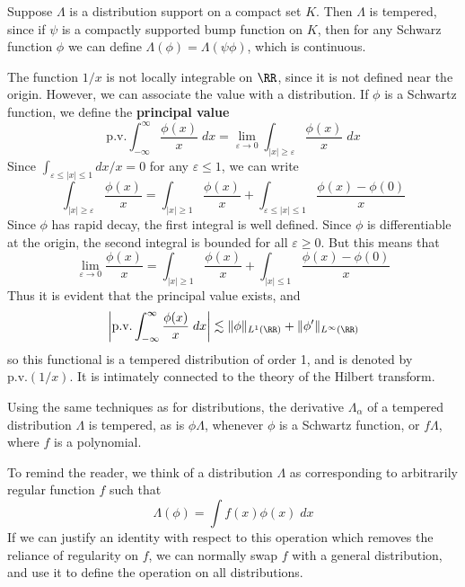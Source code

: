 \begin{example}
	Suppose $\Lambda$ is a distribution support on a compact set $K$. Then $\Lambda$ is tempered, since if $\psi$ is a compactly supported bump function on $K$, then for any Schwarz function $\phi$ we can define $\Lambda(\phi) = \Lambda(\psi \phi)$, which is continuous.
\end{example}

\begin{example}
	The function $1/x$ is not locally integrable on $\RR$, since it is not defined near the origin. However, we can associate the value with a distribution. If $\phi$ is a Schwartz function, we define the {\bf principal value}
	\[ \text{p.v.} \int_{-\infty}^\infty \frac{\phi(x)}{x}\; dx = \lim_{\varepsilon \to 0} \int_{|x| \geq \varepsilon} \frac{\phi(x)}{x}\; dx \]
	Since $\int_{\varepsilon \leq |x| \leq 1} dx/x = 0$ for any $\varepsilon \leq 1$, we can write
	\[ \int_{|x| \geq \varepsilon} \frac{\phi(x)}{x} = \int_{|x| \geq 1} \frac{\phi(x)}{x} + \int_{\varepsilon \leq |x| \leq 1} \frac{\phi(x) - \phi(0)}{x} \]
	Since $\phi$ has rapid decay, the first integral is well defined. Since $\phi$ is differentiable at the origin, the second integral is bounded for all $\varepsilon \geq 0$. But this means that
	\[ \lim_{\varepsilon \to 0} \frac{\phi(x)}{x} = \int_{|x| \geq 1} \frac{\phi(x)}{x} + \int_{|x| \leq 1} \frac{\phi(x) - \phi(0)}{x} \]
	Thus it is evident that the principal value exists, and
	\[ \left| \text{p.v.} \int_{-\infty}^\infty \frac{\phi(x)}{x}\; dx \right| \lesssim \| \phi \|_{L^1(\RR)} + \| \phi' \|_{L^\infty(\RR)} \]
	so this functional is a tempered distribution of order 1, and is denoted by $\text{p.v.}(1/x)$. It is intimately connected to the theory of the Hilbert transform. 
\end{example}

Using the same techniques as for distributions, the derivative $\Lambda_\alpha$ of a tempered distribution $\Lambda$ is tempered, as is $\phi \Lambda$, whenever $\phi$ is a Schwartz function, or $f \Lambda$, where $f$ is a polynomial.

To remind the reader, we think of a distribution $\Lambda$ as corresponding to arbitrarily regular function $f$ such that
%
\[ \Lambda(\phi) = \int f(x) \phi(x)\; dx \]
%
If we can justify an identity with respect to this operation which removes the reliance of regularity on $f$, we can normally swap $f$ with a general distribution, and use it to define the operation on all distributions.

